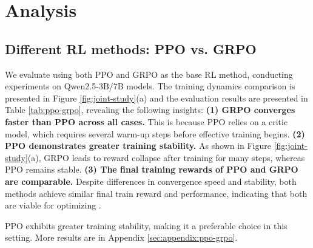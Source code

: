 \section{Analysis}

\subsection{Different RL methods: PPO vs. GRPO}\label{sec:ppo-grpo}

We evaluate \Ours using both PPO and GRPO as the base RL method, conducting experiments on Qwen2.5-3B/7B models. The training dynamics comparison is presented in Figure \ref{fig:joint-study}(a) and the evaluation results are presented in Table \ref{tab:ppo-grpo}, revealing the following insights:
\textbf{(1) GRPO converges faster than PPO across all cases.} This is because PPO relies on a critic model, which requires several warm-up steps before effective training begins.
\textbf{(2) PPO demonstrates greater training stability.} As shown in Figure \ref{fig:joint-study}(a), GRPO leads to reward collapse after training for many steps, whereas PPO remains stable.
\textbf{(3) The final training rewards of PPO and GRPO are comparable.} Despite differences in convergence speed and stability, both methods achieve similar final train reward and performance, indicating that both are viable for optimizing \Ours.

PPO exhibits greater training stability, making it a preferable choice in this setting. 
More results are in Appendix \ref{sec:appendix:ppo-grpo}.

